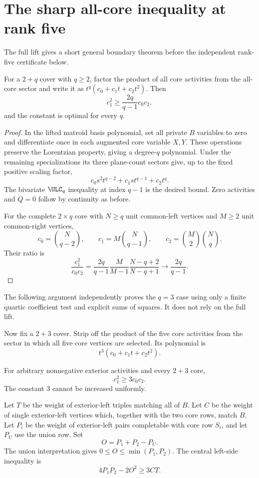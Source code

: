 \section{The sharp all-core inequality at rank five}\label{sec:forcedcore}
The full lift gives a short general boundary theorem before the independent rank-five certificate below.
\begin{theorem}\label{thm:generalcore}
For a $2+q$ cover with $q\ge2$, factor the product of all core activities from the all-core sector and write it as $t^q(c_0+c_1t+c_2t^2)$. Then
\[
 c_1^2\ge\frac{2q}{q-1}c_0c_2,
\]
and the constant is optimal for every $q$.
\end{theorem}
\begin{proof}
In the lifted matroid basis polynomial, set all private $B$ variables to zero and differentiate once in each augmented core variable $X,Y$. These operations preserve the Lorentzian property, giving a degree-$q$ polynomial. Under the remaining specializations its three plane-count sectors give, up to the fixed positive scaling factor,
\[
 c_0s^2t^{q-2}+c_1st^{q-1}+c_2t^q.
\]
The bivariate $\ULC_q$ inequality at index $q-1$ is the desired bound. Zero activities and $Q=0$ follow by continuity as before.

For the complete $2\times q$ core with $N\ge q$ unit common-left vertices and $M\ge2$ unit common-right vertices,
\[
 c_0=\binom N{q-2},\qquad c_1=M\binom N{q-1},\qquad
 c_2=\binom M2\binom Nq.
\]
Their ratio is
\[
 \frac{c_1^2}{c_0c_2}
 =\frac{2q}{q-1}\frac{M}{M-1}\frac{N-q+2}{N-q+1}
 \longrightarrow\frac{2q}{q-1}.
\]
\end{proof}

The following argument independently proves the $q=3$ case using only a finite quartic coefficient test and explicit sums of squares. It does not rely on the full lift.

Now fix a $2+3$ cover. Strip off the product of the five core activities from the sector in which all five core vertices are selected. Its polynomial is
\[
 t^3(c_0+c_1t+c_2t^2).
\]
\begin{theorem}\label{thm:three}
For arbitrary nonnegative exterior activities and every $2+3$ core,
\[
 c_1^2\ge3c_0c_2.
\]
The constant $3$ cannot be increased uniformly.
\end{theorem}

Let $T$ be the weight of exterior-left triples matching all of $B$. Let $C$ be the weight of single exterior-left vertices which, together with the two core rows, match $B$. Let $P_i$ be the weight of exterior-left pairs completable with core row $S_i$, and let $P_U$ use the union row. Set
\[
 O=P_1+P_2-P_U.
\]
The union interpretation gives $0\le O\le\min(P_1,P_2)$. The central left-side inequality is
\begin{equation}\label{eq:leftkey}
 4P_1P_2-2O^2\ge3CT.
\end{equation}

